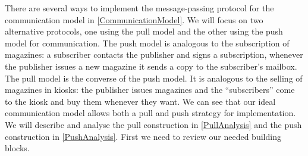 There are several ways to implement the message-passing protocol for the 
communication model in \cref{CommunicationModel}.
We will focus on two alternative protocols, one using the pull model and the 
other using the push model for communication.
The push model is analogous to the subscription of magazines:
a subscriber contacts the publisher and signs a subscription, whenever the 
publisher issues a new magazine it sends a copy to the subscriber's mailbox.
The pull model is the converse of the push model.
It is analogous to the selling of magazines in kiosks:
the publisher issues magazines and the \enquote{subscribers} come to the kiosk 
and buy them whenever they want.
We can see that our ideal communication model allows both a pull and push 
strategy for implementation.
We will describe and analyse the pull construction in \cref{PullAnalysis} and 
the push construction in \cref{PushAnalysis}.
First we need to review our needed building blocks.
